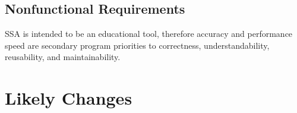 \documentclass[12pt]{article}
\begin{document}
\subsection{Nonfunctional Requirements}
\label{Sec:NR}
SSA is intended to be an educational tool, therefore accuracy and performance speed are secondary program priorities to correctness, understandability, reusability, and maintainability.
\section{Likely Changes}
\label{Sec:LC}
\end{document}
